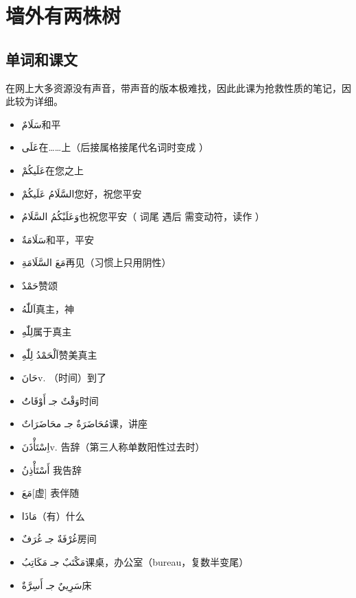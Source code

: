 \chapter{墙外有两株树}

\section{ 单词和课文}

\begin{note}
     在网上大多资源没有声音，带声音的版本极难找，因此此课为抢救性质的笔记，因此较为详细。
\end{note}

\begin{itemize}
    \item \ac{سَلَامٌ}{和平}
    \item \ac{عَلَى}{在……上（后接属格接尾代名词时变成 ）}
    \item \ac{عَلَيكُمْ}{在您之上}
    \item \ac{السَّلَامُ عَلَيكُمْ}{您好，祝您平安}
    \item \ac{وَعَلَيْكُمُ السَّلَامُ}{也祝您平安（  词尾  遇后  需变动符，读作 ）}
    \item \ac{سَلَامَةٌ}{和平，平安}
    \item \ac{مَعَ السَّلَامَةِ}{再见（习惯上只用阴性）}
    \item \ac{حَمْدٌ}{赞颂}
    \item \ac{اَللّٰهُ}{真主，神}
    \item \ac{لِلّٰهِ}{属于真主}
    \item \ac{اَلْحَمْدُ لِلّٰهِ}{赞美真主}
    \item \ac{حَانَ}{v. （时间）到了}
    \item \ac{وَقْتٌ جـ أَوْقَاتَُ}{时间}
    \item \ac{مُحَاضَرَةٌ جـ محَاضَرَاتٌ}{课，讲座}
    \item \ac{اِسْتَأْذَنَ}{v. 告辞（第三人称单数阳性过去时）}
    \item \ac{أَسْتَأْذِنُ }{我告辞}
    \item \ac{مَعَ}{[虚] 表伴随}
    \item \ac{مَاذَا}{（有）什么}
    \item \ac{غُرْفَةٌ جـ غُرَفٌ}{房间}
    \item \ac{مَكْتَبٌ جـ مَكَاتِبُ}{课桌，办公室（bureau，复数半变尾）}
    \item \ac{سَرِييٌ جـ أَسِرَّةٌ}{床}

\end{itemize}
